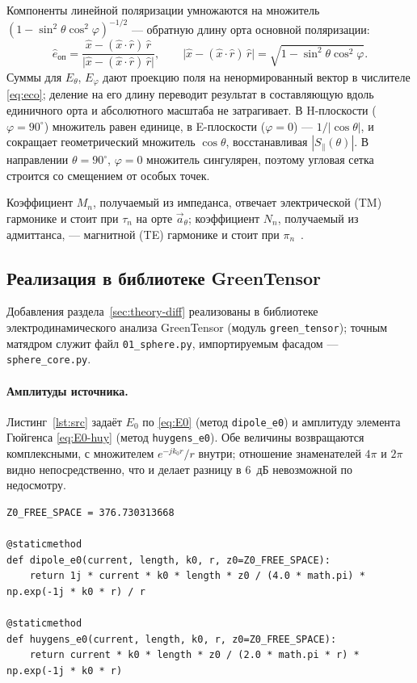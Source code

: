 \documentclass[11pt,a4paper]{article}
\newcommand{\ao}{\vec a_\theta}
\begin{document}
Компоненты линейной поляризации умножаются на множитель
$(1-\sin^2\theta\cos^2\varphi)^{-1/2}$ --- обратную длину орта основной
поляризации:
%
\begin{equation}
  \label{eq:eco}
  \hat e_{\text{оп}} = \frac{\hat x - (\hat x\cdot\hat r)\,\hat r}
                            {\bigl|\hat x - (\hat x\cdot\hat r)\,\hat r\bigr|},
  \qquad
  \bigl|\hat x - (\hat x\cdot\hat r)\,\hat r\bigr| = \sqrt{1-\sin^2\theta\cos^2\varphi} .
\end{equation}
%
Суммы для $E_\theta$, $E_\varphi$ дают проекцию поля на ненормированный вектор в
числителе \eqref{eq:eco}; деление на его длину переводит результат в составляющую
вдоль единичного орта и абсолютного масштаба не затрагивает. В H-плоскости
($\varphi = 90^\circ$) множитель равен единице, в E-плоскости ($\varphi = 0$) ---
$1/|\cos\theta|$, и сокращает геометрический множитель $\cos\theta$, восстанавливая
$|S_\parallel(\theta)|$. В направлении $\theta = 90^\circ$, $\varphi = 0$ множитель
сингулярен, поэтому угловая сетка строится со смещением от особых точек.

Коэффициент $M_n$, получаемый из импеданса, отвечает электрической (TM) гармонике и
стоит при $\tau_n$ на орте $\ao$; коэффициент $N_n$, получаемый из адмиттанса, ---
магнитной (TE) гармонике и стоит при $\pi_n$~\cite{bhmie}.

\subsection{Реализация в библиотеке GreenTensor}
\label{sec:impl-diff}

Добавления раздела~\ref{sec:theory-diff} реализованы в библиотеке
электродинамического анализа GreenTensor (модуль \texttt{green\_tensor}); точным
матядром служит файл \texttt{01\_sphere.py}, импортируемым фасадом ---
\texttt{sphere\_core.py}.

\paragraph{Амплитуды источника.}
Листинг~\ref{lst:src} задаёт $E_0$ по \eqref{eq:E0} (метод \texttt{dipole\_e0}) и
амплитуду элемента Гюйгенса \eqref{eq:E0-huy} (метод \texttt{huygens\_e0}). Обе
величины возвращаются комплексными, с множителем $e^{-jk_0r}/r$ внутри; отношение
знаменателей $4\pi$ и $2\pi$ видно непосредственно, что и делает разницу в $6$~дБ
невозможной по недосмотру.

\begin{lstlisting}[style=py,caption={\texttt{green\_tensor/sphere\_core.py} ---
амплитуды источников \eqref{eq:E0} и \eqref{eq:E0-huy}},label={lst:src}]
Z0_FREE_SPACE = 376.730313668

@staticmethod
def dipole_e0(current, length, k0, r, z0=Z0_FREE_SPACE):
    return 1j * current * k0 * length * z0 / (4.0 * math.pi) * np.exp(-1j * k0 * r) / r

@staticmethod
def huygens_e0(current, length, k0, r, z0=Z0_FREE_SPACE):
    return current * k0 * length * z0 / (2.0 * math.pi * r) * np.exp(-1j * k0 * r)
\end{lstlisting}
\end{document}
